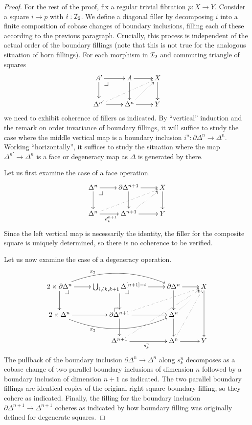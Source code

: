 \documentclass[reqno,10pt,a4paper,oneside]{amsart}
\begin{document}
\begin{proof}
For the rest of the proof, fix a regular trivial fibration $p : X \to Y$.
Consider a square $i \to p$ with $i : \cal{I}_2$.
We define a diagonal filler by decomposing $i$ into a finite composition of cobase changes of boundary inclusions, filling each of these according to the previous paragraph.
Crucially, this process is independent of the actual order of the boundary fillings (note that this is not true for the analogous situation of horn fillings).
For each morphism in $\cal{I}_2$ and commuting triangle of squares
\[
\xymatrix{
  A'
  \ar[r]
  \ar[d]
  \pullback{dr}
&
  A
  \ar[d]
  \ar[r]
&
  X
  \ar[d]
\\
  \Delta^{n'}
  \ar[r]
  \ar@{.>}[urr]
&
  \Delta^n
  \ar[r]
  \ar@{.>}[ur]
&
  Y
}
\]
we need to exhibit coherence of fillers as indicated.
By ``vertical'' induction and the remark on order invariance of boundary fillings, it will suffice to study the case where the middle vertical map is a boundary inclusion $i^n : \partial \Delta^n \to \Delta^n$.
Working ``horizontally'', it suffices to study the situation where the map $\Delta^{n'} \to \Delta^n$ is a face or degeneracy map as $\Delta$ is generated by there.

Let us first examine the case of a face operation.
\[
\xymatrix{
  \Delta^n
  \ar[r]
  \ar[d]
  \pullback{dr}
&
  \partial \Delta^{n+1}
  \ar[d]
  \ar[r]
&
  X
  \ar[d]
\\
  \Delta^n
  \ar[r]_{d_k^{n+1}}
  \ar@{.>}[urr]
&
  \Delta^{n+1}
  \ar[r]
  \ar@{.>}[ur]
&
  Y
}
\]
Since the left vertical map is necessarily the identity, the filler for the composite square is uniquely determined, so there is no coherence to be verified.

Let us now examine the case of a degeneracy operation.
\[
\xymatrix{
  2 \times \partial \Delta^n
  \ar[r]
  \ar[d]
  \ar@/^2em/[rr]^(0.3){\pi_2}
  \pullback{dr}
&
  \bigcup_{i \neq k, k+1} \Delta^{[n+1] - i}
  \ar[r]
  \ar[d]
  \pullback{dr}
&
  \partial \Delta^n
  \ar[d]
  \ar[r]
&
  X
  \ar[dd]
\\
  2 \times \Delta^n
  \ar[r]
  \ar@/_2em/[rr]_(0.3){\pi_2}
&
  \partial \Delta^{n+1}
  \ar[r]
  \ar[d]
  \ar@{.>}[urr]
  \pullback{ul}
&
  \Delta^n
  \ar[d]
  \ar@{.>}[ur]
\\&
  \Delta^{n+1}
  \ar[r]_{s_k^n}
  \ar@{.>}[uurr]
&
  \Delta^n
  \ar[r]
  \ar@{.>}[uur]
&
  Y
}
\]
The pullback of the boundary inclusion $\partial \Delta^n \to \Delta^n$ along $s_k^n$ decomposes as a cobase change of two parallel boundary inclusions of dimension $n$ followed by a boundary inclusion of dimension $n+1$ as indicated.
The two parallel boundary fillings are identical copies of the original right square boundary filling, so they cohere as indicated.
Finally, the filling for the boundary inclusion $\partial \Delta^{n+1} \to \Delta^{n+1}$ coheres as indicated by how boundary filling was originally defined for degenerate squares.
\end{proof}
\end{document}
